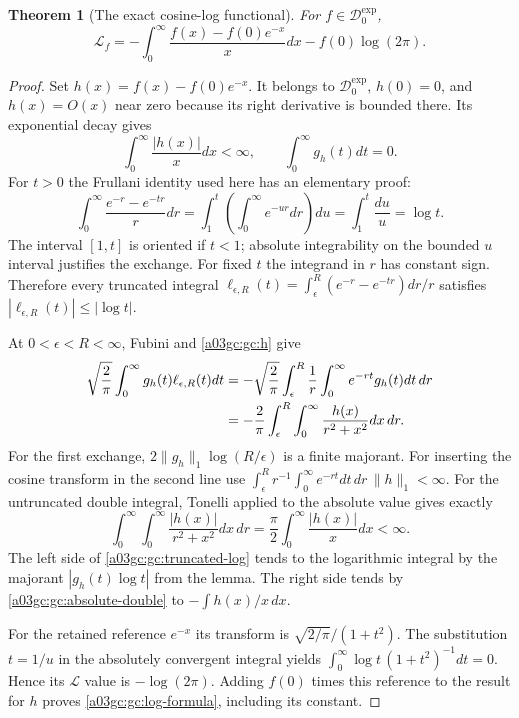 \documentclass[11pt,a4paper]{article}
\newtheorem{theorem}{Theorem}[section]
\begin{document}
\begin{theorem}[The exact cosine-log functional]
For $f\in\mathcal D_0^{\exp}$,
\begin{equation}
 \boxed{\displaystyle
 \mathscr L_f=-\int_0^\infty\frac{f(x)-f(0)e^{-x}}{x}dx
                      -f(0)\log(2\pi).}
 \label{a03gc:gc:log-formula}
\end{equation}
\end{theorem}
\begin{proof}
Set $h(x)=f(x)-f(0)e^{-x}$.  It belongs to $\mathcal D_0^{\exp}$,
$h(0)=0$, and $h(x)=O(x)$ near zero because its right derivative is
bounded there.  Its exponential decay gives
\begin{equation}
 \int_0^\infty\frac{|h(x)|}{x}dx<\infty,
 \qquad \int_0^\infty g_h(t)dt=0.
 \label{a03gc:gc:h}
\end{equation}
For $t>0$ the Frullani identity used here has an elementary proof:
\begin{equation}
 \int_0^\infty\frac{e^{-r}-e^{-tr}}{r}dr
 =\int_1^t\left(\int_0^\infty e^{-ur}dr\right)du
 =\int_1^t\frac{du}{u}=\log t.
 \label{a03gc:gc:Frullani}
\end{equation}
The interval $[1,t]$ is oriented if $t<1$; absolute integrability on the
bounded $u$ interval justifies the exchange.  For fixed $t$ the integrand
in $r$ has constant sign.  Therefore every truncated integral
$\ell_{\epsilon,R}(t)=\int_\epsilon^R(e^{-r}-e^{-tr})dr/r$
satisfies $|\ell_{\epsilon,R}(t)|\le|\log t|$.

At $0<\epsilon<R<\infty$, Fubini and \eqref{a03gc:gc:h} give
\begin{align}
 \sqrt{\frac2\pi}\int_0^\infty g_h(t)\ell_{\epsilon,R}(t)dt
 &=-\sqrt{\frac2\pi}\int_\epsilon^R\frac1r
                        \int_0^\infty e^{-rt}g_h(t)dt\,dr\notag\\
 &=-\frac2\pi\int_\epsilon^R\int_0^\infty
                           \frac{h(x)}{r^2+x^2}dx\,dr.
 \label{a03gc:gc:truncated-log}
\end{align}
For the first exchange, $2\|g_h\|_1\log(R/\epsilon)$ is a finite
majorant.  For inserting the cosine transform in the second line use
$\int_\epsilon^R r^{-1}\int_0^\infty e^{-rt}dt\,dr\,\|h\|_1<\infty$.
For the untruncated double integral, Tonelli applied to the absolute value
gives exactly
\begin{equation}
 \int_0^\infty\int_0^\infty\frac{|h(x)|}{r^2+x^2}dx\,dr
   =\frac\pi2\int_0^\infty\frac{|h(x)|}{x}dx<\infty.
 \label{a03gc:gc:absolute-double}
\end{equation}
The left side of \eqref{a03gc:gc:truncated-log} tends to the logarithmic
integral by the majorant $|g_h(t)\log t|$ from the lemma.  The right side
tends by \eqref{a03gc:gc:absolute-double} to $-\int h(x)/x\,dx$.

For the retained reference $e^{-x}$ its transform is
$\sqrt{2/\pi}/(1+t^2)$.  The substitution $t=1/u$ in the absolutely
convergent integral yields
$\int_0^\infty\log t\,(1+t^2)^{-1}dt=0$.
Hence its $\mathscr L$ value is $-\log(2\pi)$.
Adding $f(0)$ times this reference to the result for $h$ proves
\eqref{a03gc:gc:log-formula}, including its constant.
\end{proof}
\end{document}
